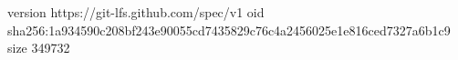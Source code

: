 version https://git-lfs.github.com/spec/v1
oid sha256:1a934590c208bf243e90055cd7435829c76c4a2456025e1e816ced7327a6b1c9
size 349732
